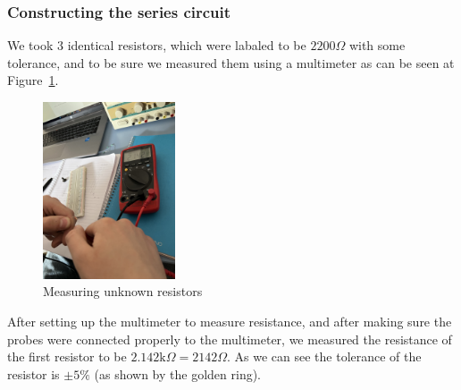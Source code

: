 \documentclass[a4paper, 10pt]{article}
\newcommand{\figref}[1]{Figure~\ref{#1}}
\begin{document}
				\subsubsection{Constructing the series circuit}
					We took 3 identical resistors, which were labaled to be $2200\Omega$ with some tolerance, and to be sure we measured them using a multimeter as can be seen at \figref{fig:MeasuringUnknownResistors}.
					\begin{figure}[h!]
						\centering
						\includegraphics[width=0.35\textwidth]{./images/MeasuringUnknownResistors.jpeg}
						\caption{Measuring unknown resistors}
						\label{fig:MeasuringUnknownResistors}
					\end{figure}

					After setting up the multimeter to measure resistance, and after making sure the probes were connected properly to the multimeter,
					we measured the resistance of the first resistor to be $2.142\text{k}\Omega = 2142\Omega$. As we can see the tolerance of the resistor is $\pm 5\%$ (as shown by the golden ring).

					\vspace{5mm}
\end{document}

